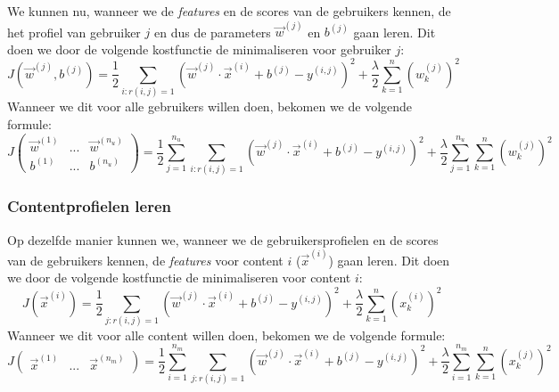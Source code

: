 We kunnen nu, wanneer we de \textit{features} en de scores van de gebruikers kennen, de het profiel van gebruiker $j$ en dus de parameters $\vec{w}^{(j)}$ en $b^{(j)}$ gaan leren. Dit doen we door de volgende kostfunctie de minimaliseren voor gebruiker $j$:
\begin{equation}
	J(\vec{w}^{(j)}, b^{(j)}) = \frac{1}{2} \sum_{i:r(i, j) = 1} (\vec{w}^{(j)} \cdot \vec{x}^{(i)} + b^{(j)} - y^{(i, j)})^{2} + \frac{\lambda}{2} \sum_{k=1}^{n}(w_{k}^{(j)})^{2}
\end{equation}
\noindent
Wanneer we dit voor alle gebruikers willen doen, bekomen we de volgende formule:
\begin{equation}
	J \begin{pmatrix} \vec{w}^{(1)} & ... & \vec{w}^{(n_{u})}\\ b^{(1)} & ... & b^{(n_{u})} \end{pmatrix} 
	= \frac{1}{2} \sum_{j=1}^{n_{u}} \sum_{i:r(i, j) = 1} (\vec{w}^{(j)} \cdot \vec{x}^{(i)} + b^{(j)} - y^{(i, j)})^{2} 
	+ \frac{\lambda}{2} \sum_{j=1}^{n_{u}} \sum_{k=1}^{n}(w_{k}^{(j)})^{2}
	\label{eq:user-cost}
\end{equation}

\subsubsection{Contentprofielen leren}

Op dezelfde manier kunnen we, wanneer we de gebruikersprofielen en de scores van de gebruikers kennen, de \textit{features} voor content $i$ ($\vec{x}^{(i)}$) gaan leren. Dit doen we door de volgende kostfunctie de minimaliseren voor content $i$:
\begin{equation}
	J(\vec{x}^{(i)}) = \frac{1}{2} \sum_{j:r(i, j) = 1} (\vec{w}^{(j)} \cdot \vec{x}^{(i)} + b^{(j)} - y^{(i, j)})^{2} + \frac{\lambda}{2} \sum_{k=1}^{n}(x_{k}^{(i)})^{2}
\end{equation}
\noindent
Wanneer we dit voor alle content willen doen, bekomen we de volgende formule:
\begin{equation}
	J \begin{pmatrix} \vec{x}^{(1)} & ... & \vec{x}^{(n_{m})}\end{pmatrix} 
	= \frac{1}{2} \sum_{i=1}^{n_{m}} \sum_{j:r(i, j) = 1} (\vec{w}^{(j)} \cdot \vec{x}^{(i)} + b^{(j)} - y^{(i, j)})^{2} 
	+ \frac{\lambda}{2} \sum_{i=1}^{n_{m}} \sum_{k=1}^{n}(x_{k}^{(j)})^{2}
	\label{eq:content-cost}
\end{equation}

